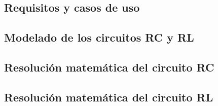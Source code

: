 \documentclass[12pt, a4paper, twoside]{article}
\begin{document}
\begin{umaappendices}
  \section{Requisitos y casos de uso}
  
\end{umaappendices}


\begin{umaappendices}
  \section{Modelado de los circuitos RC y RL}
  
\end{umaappendices}

\begin{umaappendices}
  \section{Resolución matemática del circuito RC}
  
\end{umaappendices}

\begin{umaappendices}
  \section{Resolución matemática del circuito RL}
  
\end{umaappendices}




\end{document}
